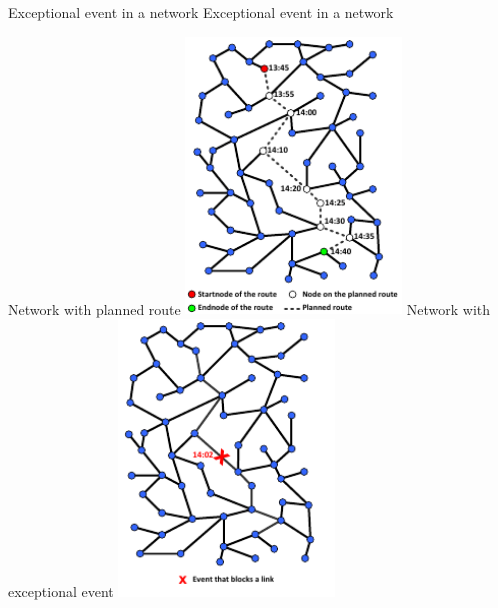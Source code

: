 \createfigure%
{Exceptional event in a network}%
{Exceptional event in a network}%
{\label{fig:labelExceptionalEventExample}}%
{%
  \createsubfigure%
  {Network with planned route}%
  {\includegraphics[width=0.43\textwidth, angle=0]{extending/figures/WithinDayReplanning/network_original_route}}%
  {\label{fig:labelNetworkPlannedRoute}}%
  {\qquad}%
  \createsubfigure%
  {Network with exceptional event}%
  {\includegraphics[width=0.43\textwidth, angle=0]{extending/figures/WithinDayReplanning/network_exceptional_event}}%
  {\label{fig:labelNetworkExceptionalEvent}}%
  {\vspace{5mm}}%

}
